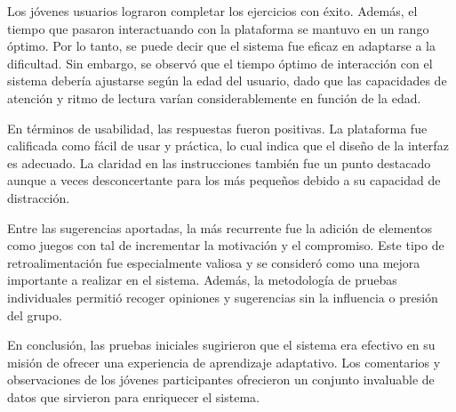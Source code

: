 Los jóvenes usuarios lograron completar los ejercicios con éxito. Además, el tiempo que pasaron interactuando con la plataforma se mantuvo en un rango óptimo. Por lo tanto, se puede decir que el sistema fue eficaz en adaptarse a la dificultad. Sin embargo, se observó que el tiempo óptimo de interacción con el sistema debería ajustarse según la edad del usuario, dado que las capacidades de atención y ritmo de lectura varían considerablemente en función de la edad. 

En términos de usabilidad, las respuestas fueron positivas. La plataforma fue calificada como fácil de usar y práctica, lo cual indica que el diseño de la interfaz es adecuado. La claridad en las instrucciones también fue un punto destacado aunque a veces desconcertante para los más pequeños debido a su capacidad de distracción.

Entre las sugerencias aportadas, la más recurrente fue la adición de elementos como juegos con tal de incrementar la motivación y el compromiso. Este tipo de retroalimentación fue especialmente valiosa y se consideró como una mejora importante a realizar en el sistema. Además, la metodología de pruebas individuales permitió recoger opiniones y sugerencias sin la influencia o presión del grupo.

En conclusión, las pruebas iniciales sugirieron que el sistema era efectivo en su misión de ofrecer una experiencia de aprendizaje adaptativo. Los comentarios y observaciones de los jóvenes participantes ofrecieron un conjunto invaluable de datos que sirvieron para enriquecer el sistema.
